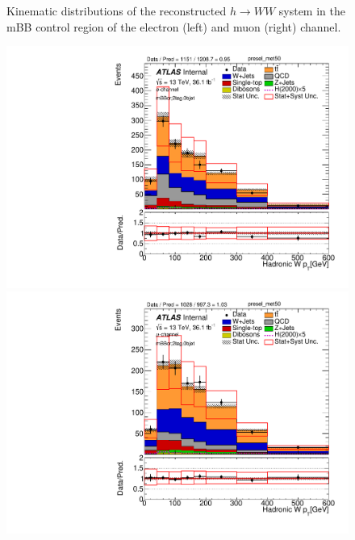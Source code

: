 \begin{figure}[!h]
\begin{center}
\caption{Kinematic distributions of the reconstructed $h \to WW$ system in the mBB control region of the electron (left) and muon (right) channel.}
\label{fig:boosted_mbbcrleptons_wwsystem}
\end{center}
\end{figure}

\begin{figure}[!h]
\begin{center}
\includegraphics[scale=0.33]{./figures/boosted/PlotByChannels/DataMC_2tag_0bjet_mbbcr_elec_presel_met50_WhadPt}  
\includegraphics[scale=0.33]{./figures/boosted/PlotByChannels/DataMC_2tag_0bjet_mbbcr_muon_presel_met50_WhadPt}  

\end{center}
\end{figure}
